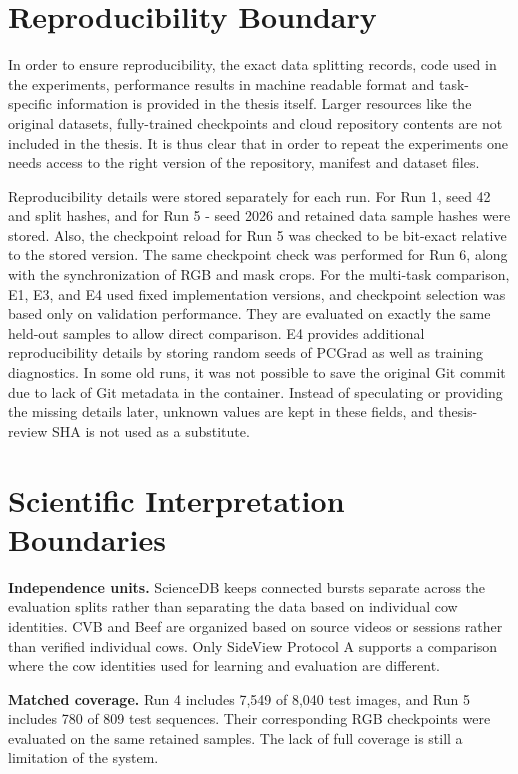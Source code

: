 \section{Reproducibility Boundary}

In order to ensure reproducibility, the exact data splitting records, code used in the experiments, performance results in machine readable format and task-specific information is provided in the thesis itself. Larger resources like the original datasets, fully-trained checkpoints and cloud repository contents are not included in the thesis. It is thus clear that in order to repeat the experiments one needs access to the right version of the repository, manifest and dataset files.

Reproducibility details were stored separately for each run. For Run 1, seed 42 and split hashes, and for Run 5 - seed 2026 and retained data sample hashes were stored. Also, the checkpoint reload for Run 5 was checked to be bit-exact relative to the stored version. The same checkpoint check was performed for Run 6, along with the synchronization of RGB and mask crops. For the multi-task comparison, E1, E3, and E4 used fixed implementation versions, and checkpoint selection was based only on validation performance. They are evaluated on exactly the same held-out samples to allow direct comparison. E4 provides additional reproducibility details by storing random seeds of PCGrad as well as training diagnostics. In some old runs, it was not possible to save the original Git commit due to lack of Git metadata in the container. Instead of speculating or providing the missing details later, unknown values are kept in these fields, and thesis-review SHA is not used as a substitute.

\section{Scientific Interpretation Boundaries}

\textbf{Independence units.} ScienceDB keeps connected bursts separate across the evaluation splits rather than separating the data based on individual cow identities. CVB and Beef are organized based on source videos or sessions rather than verified individual cows. Only SideView Protocol A supports a comparison where the cow identities used for learning and evaluation are different.

\textbf{Matched coverage.} Run 4 includes 7,549 of 8,040 test images, and Run 5 includes 780 of 809 test sequences. Their corresponding RGB checkpoints were evaluated on the same retained samples. The lack of full coverage is still a limitation of the system.

